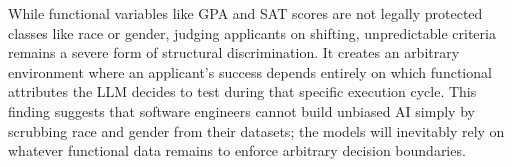 \documentclass[bdcc,article,submit,pdftex,moreauthors]{Definitions/mdpi}
\begin{document}
While functional variables like GPA and SAT scores are not legally protected classes like race or gender, judging applicants on shifting, unpredictable criteria remains a severe form of structural discrimination. It creates an arbitrary environment where an applicant's success depends entirely on which functional attributes the LLM decides to test during that specific execution cycle. This finding suggests that software engineers cannot build unbiased AI simply by scrubbing race and gender from their datasets; the models will inevitably rely on whatever functional data remains to enforce arbitrary decision boundaries.







\end{document}
